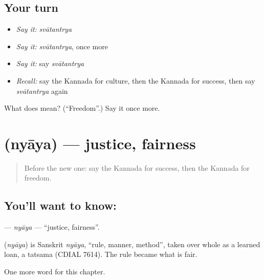 \subsection*{Your turn}
\begin{itemize}
\raggedright
  \item \emph{Say it:} \emph{svātantrya}
  \item \emph{Say it:} \emph{svātantrya}, once more
  \item \emph{Say it:} say \emph{svātantrya}
  \item \emph{Recall:} say the Kannada for culture, then the Kannada for success, then say \emph{svātantrya} again
\end{itemize}

\begin{tcolorbox}[breakable,colback=teal!4,colframe=teal!35!black,title={Before you move on}]
What does  mean? (\textquotedblleft{}Freedom\textquotedblright{}.) Say it once more.
\end{tcolorbox}
\section[\texorpdfstring{\kn{ನ್ಯಾಯ} (nyāya)}{ನ್ಯಾಯ (nyāya)}]{ (nyāya) — justice, fairness}

\label{lesson:KA-C216-nyaya}



\begin{quote}
Before the new one: say the Kannada for success, then the Kannada for freedom.
\end{quote}

\subsection*{You'll want to know: }
\textbf{} — \emph{nyāya} — \textquotedblleft{}justice, fairness\textquotedblright{}.

\begin{cousinweb}
\textbf{} (\emph{nyāya}) is Sanskrit \emph{nyāya}, \textquotedblleft{}rule, manner, method\textquotedblright{}, taken over whole as a learned loan, a tatsama (CDIAL 7614). The rule became what is fair.
\end{cousinweb}

\begin{grammarlens}[title={What you've built}]
One more word for this chapter.
\end{grammarlens}

